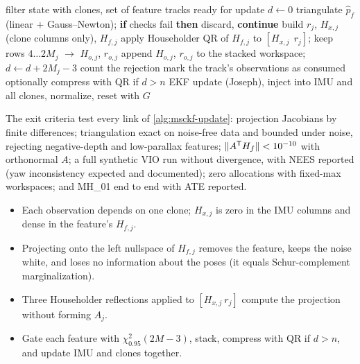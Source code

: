 \begin{algorithm}[t]
\caption{MSCKF visual update}
\label{alg:msckf-update}
\begin{algorithmic}[1]
\Require filter state with clones, set of feature tracks ready for update
\State $d \gets 0$
  \State triangulate $\hat p_f$ (linear + Gauss--Newton); \textbf{if} checks fail \textbf{then} discard, \textbf{continue}
  \State build $r_j$, $H_{x,j}$ (clone columns only), $H_{f,j}$
  \State apply Householder QR of $H_{f,j}$ to $[H_{x,j}\ \ r_j]$; keep rows $4\dots2M_j$ $\to$ $H_{o,j}$, $r_{o,j}$
    \State append $H_{o,j}$, $r_{o,j}$ to the stacked workspace; $d \gets d + 2M_j - 3$
  \Else \State count the rejection \EndIf
  \State mark the track's observations as consumed
\EndFor
{}
  \State optionally compress with QR if $d > n$
  \State EKF update (Joseph), inject into IMU and all clones, normalize, reset with $G$
\EndIf
\end{algorithmic}
\end{algorithm}

\begin{projectlink}[Milestone 10b]
The exit criteria test every link of \cref{alg:msckf-update}: projection Jacobians by finite differences; triangulation exact on
noise-free data and bounded under noise, rejecting negative-depth and low-parallax features; $\|A^{\mathsf{T}} H_f\| < 10^{-10}$ with
orthonormal $A$; a full synthetic VIO run without divergence, with NEES reported (yaw inconsistency expected and documented);
zero allocations with fixed-max workspaces; and MH\_01 end to end with ATE reported.
\end{projectlink}

\begin{takeaways}
\begin{itemize}
  \item Each observation depends on one clone; $H_{x,j}$ is zero in the IMU columns and dense in the feature's $H_{f,j}$.
  \item Projecting onto the left nullspace of $H_{f,j}$ removes the feature, keeps the noise white, and loses no information about
        the poses (it equals Schur-complement marginalization).
  \item Three Householder reflections applied to $[H_{x,j}\ r_j]$ compute the projection without forming $A_j$.
  \item Gate each feature with $\chi^2_{0.95}(2M - 3)$, stack, compress with QR if $d > n$, and update IMU and clones together.
\end{itemize}
\end{takeaways}

